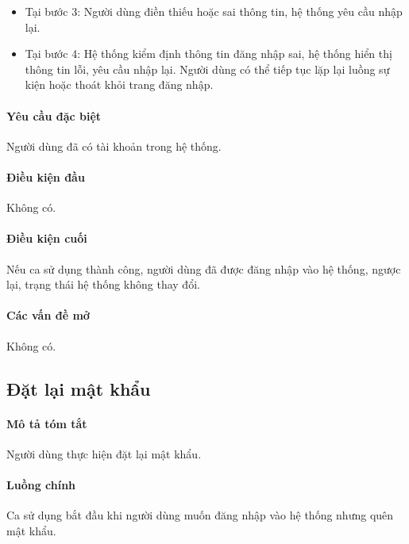 \documentclass[./../main.tex]{subfiles}
\begin{document}
\begin{itemize}
	\item
	      Tại bước 3: Người dùng điền thiếu hoặc sai thông tin, hệ thống yêu cầu
	      nhập lại.
	\item
	      Tại bước 4: Hệ thống kiểm định thông tin đăng nhập sai, hệ thống hiển
	      thị thông tin lỗi, yêu cầu nhập lại. Người dùng có thể tiếp tục lặp
	      lại luồng sự kiện hoặc thoát khỏi trang đăng nhập.
\end{itemize}

\paragraph*{Yêu cầu đặc biệt}

Người dùng đã có tài khoản trong hệ thống.

\paragraph*{Điều kiện đầu}

Không có.

\paragraph*{Điều kiện cuối}

Nếu ca sử dụng thành công, người dùng đã được đăng nhập vào hệ thống,
ngược lại, trạng thái hệ thống không thay đổi.

\paragraph*{Các vấn đề mở}

Không có.

\subsection{Đặt lại mật khẩu}
\paragraph*{Mô tả tóm tắt}

Người dùng thực hiện đặt lại mật khẩu.


\paragraph*{Luồng chính} Ca sử dụng bắt đầu khi người dùng muốn đăng nhập vào
hệ thống nhưng quên mật khẩu.
\end{document}

